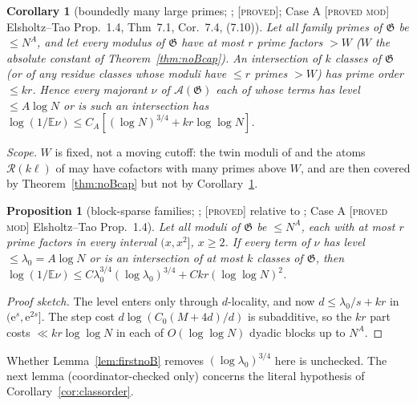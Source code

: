 \documentclass[10pt,reqno]{amsart}
\newtheorem{corollary}[theorem]{Corollary}
\newtheorem{proposition}[theorem]{Proposition}
\theoremstyle{definition}
\theoremstyle{remark}
\newcommand{\A}{\mathcal A}
\newcommand{\cR}{\mathscr R}
\newcommand{\cG}{\mathfrak G}
\newcommand{\E}{\mathbb E}
\newcommand{\e}{\mathrm e}
\newcommand{\lab}[1]{\textup{[\textsc{#1}]}}
\begin{document}
\begin{corollary}[boundedly many large primes; {\cite[Cor.~5.3]{KA3}}; \lab{proved}; Case A \lab{proved mod} Elsholtz--Tao Prop.~1.4, Thm~7.1, Cor.~7.4, (7.10)]\label{cor:boundedr}
Let all family primes of $\cG$ be $\leq N^A$, and let every modulus of $\cG$ have
at most $r$ prime factors $>W$ ($W$ the absolute constant of
Theorem~\ref{thm:noBcap}).  An intersection of $k$ classes of $\cG$ (or of
any residue classes whose moduli have $\leq r$ primes $>W$) has prime order
$\leq kr$.  Hence every majorant $\nu$ of $\A(\cG)$ each of whose terms has level
$\leq A\log N$ or is such an intersection has
$\log(1/\E\nu)\leq C_A[(\log N)^{3/4}+kr\log\log N]$.
\end{corollary}
\emph{Scope.}  $W$ is fixed, not a moving cutoff: the twin moduli of
\cite{TW2,TW4} and the atoms $\cR(k\ell)$ of \cite{TQ} may have cofactors with many
primes above $W$, and are then covered by Theorem~\ref{thm:noBcap} but not
by Corollary~\ref{cor:boundedr}.

\begin{proposition}[block-sparse families; {\cite[Prop.~7.1]{TU2}}; \lab{proved} relative to {\cite[Thm~5.1]{KA2}}; Case A \lab{proved mod} Elsholtz--Tao Prop.~1.4]\label{prop:blocksparse}
Let all moduli of $\cG$ be $\leq N^A$, each with at most $r$ prime factors in
every interval $(x,x^2]$, $x\geq2$.  If every term of $\nu$ has level
$\leq\lambda_0=A\log N$ or is an intersection of at most $k$ classes of $\cG$, then
$\log(1/\E\nu)\leq C\lambda_0^{3/4}(\log\lambda_0)^{3/4}+Ckr(\log\log N)^2$.
\end{proposition}
\begin{proof}[Proof sketch]
The level enters \cite[Thm~5.1]{KA2} only through $d$-locality, and now
$d\leq\lambda_0/s+kr$ in $(\e^s,\e^{2s}]$.  The step cost $d\log(C_0(M+4d)/d)$ is
subadditive, so the $kr$ part costs $\ll kr\log\log N$ in each of $O(\log\log N)$
dyadic blocks up to $N^A$.
\end{proof}
Whether Lemma~\ref{lem:firstnoB} removes $(\log\lambda_0)^{3/4}$ here is unchecked.
The next lemma (coordinator-checked only) concerns the literal
hypothesis of Corollary~\ref{cor:classorder}.
\end{document}
